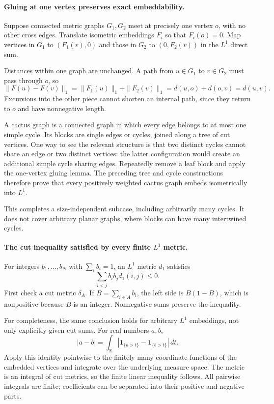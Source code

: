 \documentclass[11pt]{article}
\begin{document}
\paragraph{Gluing at one vertex preserves exact embeddability.}
Suppose connected metric graphs $G_1,G_2$ meet at precisely one vertex $o$, with no other cross edges. Translate isometric embeddings $F_i$ so that $F_i(o)=0$. Map vertices in $G_1$ to $(F_1(v),0)$ and those in $G_2$ to $(0,F_2(v))$ in the $L^1$ direct sum.

Distances within one graph are unchanged. A path from $u\in G_1$ to $v\in G_2$ must pass through $o$, so
\[
 \|F(u)-F(v)\|_1
 =\|F_1(u)\|_1+\|F_2(v)\|_1
 =d(u,o)+d(o,v)=d(u,v).
\]
Excursions into the other piece cannot shorten an internal path, since they return to $o$ and have nonnegative length.

A cactus graph is a connected graph in which every edge belongs to at most one simple cycle. Its blocks are single edges or cycles, joined along a tree of cut vertices. One way to see the relevant structure is that two distinct cycles cannot share an edge or two distinct vertices: the latter configuration would create an additional simple cycle sharing edges. Repeatedly remove a leaf block and apply the one-vertex gluing lemma. The preceding tree and cycle constructions therefore prove that every positively weighted cactus graph embeds isometrically into $L^1$.

This completes a size-independent subcase, including arbitrarily many cycles. It does not cover arbitrary planar graphs, where blocks can have many intertwined cycles.

\paragraph{The cut inequality satisfied by every finite $L^1$ metric.}
For integers $b_1,\ldots,b_N$ with $\sum_i b_i=1$, an $L^1$ metric $d_1$ satisfies
\begin{equation}\label{a409:pentagonal}
 \sum_{i<j}b_ib_jd_1(i,j)\le0.
\end{equation}
First check a cut metric $\delta_A$. If $B=\sum_{i\in A}b_i$, the left side is $B(1-B)$, which is nonpositive because $B$ is an integer. Nonnegative sums preserve the inequality.

For completeness, the same conclusion holds for arbitrary $L^1$ embeddings, not only explicitly given cut sums. For real numbers $a,b$,
\[
 |a-b|=\int_{\mathbb R}
       |\mathbf1_{\{a>t\}}-\mathbf1_{\{b>t\}}|\,dt.
\]
Apply this identity pointwise to the finitely many coordinate functions of the embedded vertices and integrate over the underlying measure space. The metric is an integral of cut metrics, so the finite linear inequality follows. All pairwise integrals are finite; coefficients can be separated into their positive and negative parts.
\end{document}
